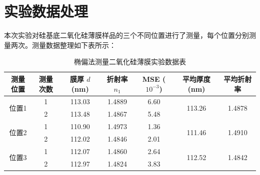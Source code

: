 \documentclass[11pt]{article}
\begin{document}
\section{实验数据处理}

本次实验对硅基底二氧化硅薄膜样品的三个不同位置进行了测量，每个位置分别测量两次。测量数据整理如下表所示：

\begin{table}[H]
    \centering
    \caption{椭偏法测量二氧化硅薄膜实验数据表}
    \vspace{0.2cm}
    \begin{tabular}{ccccccc}
        \toprule
        \textbf{测量位置} & \textbf{测量次数} & \textbf{膜厚 $d$ (nm)} & \textbf{折射率 $n_1$} & \textbf{MSE ($10^{-3}$)} & \textbf{平均厚度 (nm)} & \textbf{平均折射率} \\
        \midrule
        \multirow{2}{*}{位置1} & 1 & 113.03 & 1.4889 & 6.60 & \multirow{2}{*}{113.26} & \multirow{2}{*}{1.4878} \\
                               & 2 & 113.48 & 1.4867 & 5.48 & & \\
        \midrule
        \multirow{2}{*}{位置2} & 1 & 110.90 & 1.4973 & 1.36 & \multirow{2}{*}{111.46} & \multirow{2}{*}{1.4910} \\
                               & 2 & 112.02 & 1.4846 & 2.01 & & \\
        \midrule
        \multirow{2}{*}{位置3} & 1 & 112.07 & 1.4860 & 2.64 & \multirow{2}{*}{112.52} & \multirow{2}{*}{1.4842} \\
                               & 2 & 112.97 & 1.4824 & 3.83 & & \\
        \bottomrule
    \end{tabular}
\end{table}
\end{document}
